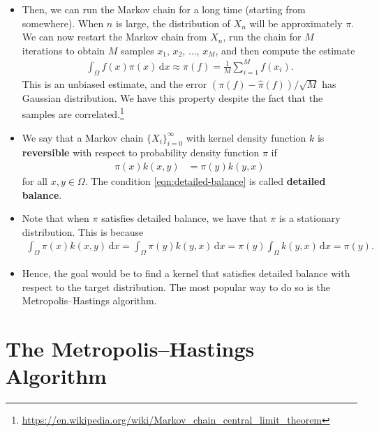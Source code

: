 \documentclass[10pt]{article}
\newcommand{\dee}{\mathrm{d}}
\begin{document}
\begin{itemize}
  \item Then, we can run the Markov chain for a long time (starting from somewhere). When $n$ is large, the distribution of $X_n$ will be approximately $\pi$. We can now restart the Markov chain from $X_n$, run the chain for $M$ iterations to obtain $M$ samples $x_1$, $ x_2$, $\dotsc$, $ x_M$, and then compute the estimate
  \begin{align*}
    \int_\Omega f( x) \pi( x)\, \dee x \approx \widehat{\pi}(f) = \frac{1}{M} \sum_{i=1}^M f( x_i).
  \end{align*}
  This is an unbiased estimate, and the error $(\pi(f) - \widehat{\pi}(f))/\sqrt{M}$ has Gaussian distribution. We have this property despite the fact that the samples are correlated.\footnote{\url{https://en.wikipedia.org/wiki/Markov_chain_central_limit_theorem}}

  \item We say that a Markov chain $\{ X_i \}_{i=0}^\infty$ with kernel density function $k$ is {\bf reversible} with respect to probability density function $\pi$ if
  \begin{align} \label{eqn:detailed-balance}
    \pi(x) k(x,y) &= \pi(y) k(y,x) 
  \end{align}
  for all $x,y \in \Omega$. The condition \eqref{eqn:detailed-balance} is called {\bf detailed balance}.  

  \item Note that when $\pi$ satisfies detailed balance, we have that $\pi$ is a stationary distribution. This is because
  \begin{align*}
    \int_\Omega \pi(x) k(x, y)\, \dee x = \int_\Omega \pi(y)k(y, x)\, \dee x = \pi(y) \int_\Omega k(y, x)\, \dee x = \pi(y).
  \end{align*}

  \item Hence, the goal would be to find a kernel that satisfies detailed balance with respect to the target distribution. The most popular way to do so is the Metropolis--Hastings algorithm.
\end{itemize}

\section{The Metropolis--Hastings Algorithm} \label{sec:metropolis-hastings}
\end{document}
